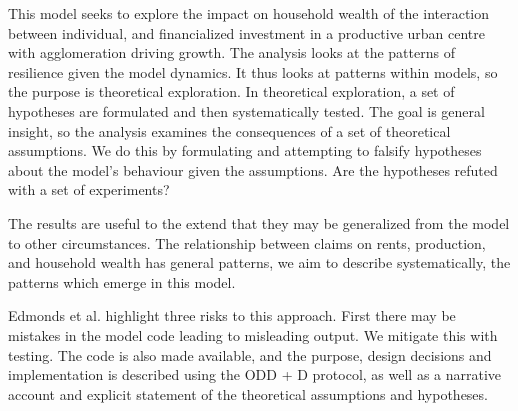 This model seeks to explore the impact on household wealth of the interaction between individual, and financialized investment in a productive urban centre with agglomeration driving growth. 
The analysis looks at the patterns of resilience given the model dynamics. It thus looks at patterns within models, so the purpose is theoretical exploration. In theoretical exploration, a set of hypotheses are formulated and then systematically tested. The goal is general insight, so the analysis examines the consequences of a set of theoretical assumptions. We do this by formulating and attempting to falsify hypotheses about the model's behaviour given the assumptions. 
Are the hypotheses refuted with a set of experiments?

The results are useful to the extend that they may be generalized from the model to other circumstances. The relationship between claims on rents, production, and household wealth has general patterns, we aim to describe systematically, the patterns which emerge in this model. 


Edmonds et al. highlight three risks to this approach. First there may be mistakes in the model code leading to misleading output. We mitigate this with testing. %
The code is also made available, and the purpose, design decisions and implementation is described using the ODD + D protocol, as well as a narrative account and explicit statement of the theoretical assumptions %
and hypotheses. %

